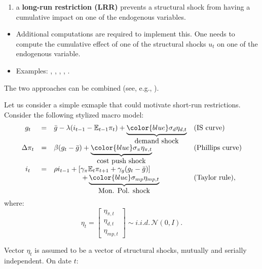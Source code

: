 \documentclass[
  12pt,
]{book}
\providecommand{\tightlist}{%
  \setlength{\itemsep}{0pt}\setlength{\parskip}{0pt}}
\theoremstyle{definition}
\theoremstyle{definition}
\theoremstyle{definition}
\theoremstyle{definition}
\theoremstyle{remark}
\begin{document}
\begin{enumerate}
\def\labelenumi{\arabic{enumi}.}
\setcounter{enumi}{1}
\tightlist
\item
  a \textbf{long-run restriction (LRR)} prevents a structural shock from having a cumulative impact on one of the endogenous variables.
\end{enumerate}

\begin{itemize}
\tightlist
\item
  Additional computations are required to implement this. One needs to compute the cumulative effect of one of the structural shocks \(u_{t}\) on one of the endogenous variable.
\item
  Examples: \citet{Blanchard_Quah_1989}, \citet{Faust_Leeper_1997}, \citet{Gali_1999}, \citet{Erceg_et_al_2005}, \citet{NBERc11177}.
\end{itemize}

The two approaches can be combined (see, e.g., \citet{Gerlach_Smets_1995}).

Let us consider a simple exmaple that could motivate short-run restrictions. Consider the following stylized macro model:
\begin{equation}
\begin{array}{clll}
g_{t}&=& \bar{g}-\lambda(i_{t-1}-\mathbb{E}_{t-1}\pi_{t})+ \underbrace{{\color{blue}\sigma_d \eta_{d,t}}}_{\mbox{demand shock}}& (\mbox{IS curve})\\
\Delta \pi_{t} & = & \beta (g_{t} - \bar{g})+ \underbrace{{\color{blue}\sigma_{\pi} \eta_{\pi,t}}}_{\mbox{cost push shock}} & (\mbox{Phillips curve})\\
i_{t} & = & \rho i_{t-1} + \left[ \gamma_\pi \mathbb{E}_{t}\pi_{t+1}  + \gamma_g (g_{t} - \bar{g}) \right]\\
&& \qquad \qquad+\underbrace{{\color{blue}\sigma_{mp} \eta_{mp,t}}}_{\mbox{Mon. Pol. shock}} & (\mbox{Taylor rule}),
\end{array}\label{eq:systemI}
\end{equation}
where:
\begin{equation}
\eta_t = 
\left[
\begin{array}{c}
\eta_{\pi,t}\\
\eta_{d,t}\\
\eta_{mp,t}
\end{array}
\right]
\sim i.i.d.\,\mathcal{N}(0,I).\label{eq:covU}
\end{equation}

Vector \(\eta_t\) is assumed to be a vector of structural shocks, mutually and serially independent. On date \(t\):
\end{document}
